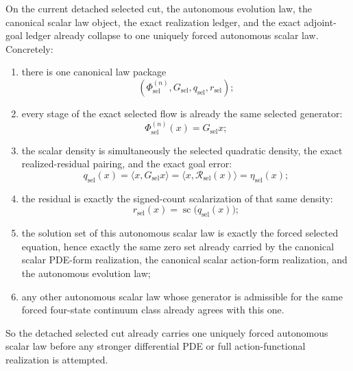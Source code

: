 \begin{theorem}
\label{thm:the-selected-cut-already-carries-one-uniquely-forced-autonomous-scalar-law}
On the current detached selected cut, the autonomous evolution law, the
canonical scalar law object, the exact realization ledger, and the exact
adjoint-goal ledger already collapse to one uniquely forced autonomous scalar
law. Concretely:
\begin{enumerate}
\item there is one canonical law package
\[
(\Phi_{\mathrm{sel}}^{(n)},G_{\mathrm{sel}},q_{\mathrm{sel}},r_{\mathrm{sel}});
\]
\item every stage of the exact selected flow is already the same selected
      generator:
\[
\Phi_{\mathrm{sel}}^{(n)}(x)=G_{\mathrm{sel}}x;
\]
\item the scalar density is simultaneously the selected quadratic density, the
      exact realized-residual pairing, and the exact goal error:
\[
q_{\mathrm{sel}}(x)
 =\langle x,G_{\mathrm{sel}}x\rangle
 =\langle x,\mathcal R_{\mathrm{sel}}(x)\rangle
 =\eta_{\mathrm{sel}}(x);
\]
\item the residual is exactly the signed-count scalarization of that same
      density:
\[
r_{\mathrm{sel}}(x)=\operatorname{sc}\!\bigl(q_{\mathrm{sel}}(x)\bigr);
\]
\item the solution set of this autonomous scalar law is exactly the forced
      selected equation, hence exactly the same zero set already carried by
      the canonical scalar PDE-form realization, the canonical scalar
      action-form realization, and the autonomous evolution law;
\item any other autonomous scalar law whose generator is admissible for the
      same forced four-state continuum class already agrees with this one.
\end{enumerate}
So the detached selected cut already carries one uniquely forced autonomous
scalar law before any stronger differential PDE or full action-functional
realization is attempted.
\end{theorem}

